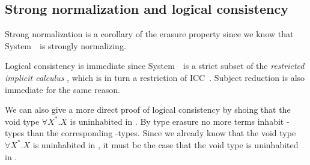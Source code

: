 
\subsection{Strong normalization and logical consistency}
\label{ssec:fi:sn}
Strong normalization is a corollary of the erasure property since we know that
System~\Fw\ is strongly normalizing.

Logical consistency is immediate since
System~\Fi\ is a strict subset of the \emph{restricted implicit calculus}
\cite{Miquel00}, which is in turn a restriction of ICC~\cite{Miquel01}.
Subject reduction is also immediate for the same reason.

We can also give a more direct proof of logical consistency by shoing that
the void type $\forall X^{*}.X$ is uninhabited in \Fi. By type erasure
no more terms inhabit \Fi-types than the corresponding \Fw-types.
Since we already know that the void type $\forall X^{*}.X$
is uninhabited in \Fw, it must be the case that the void type
is uninhabited in \Fi.

